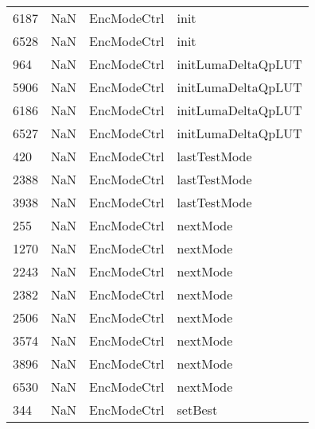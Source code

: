 \begin{tabular}{llll}
6187 &                   NaN &                EncModeCtrl &                                      init \\
6528 &                   NaN &                EncModeCtrl &                                      init \\
964  &                   NaN &                EncModeCtrl &                        initLumaDeltaQpLUT \\
5906 &                   NaN &                EncModeCtrl &                        initLumaDeltaQpLUT \\
6186 &                   NaN &                EncModeCtrl &                        initLumaDeltaQpLUT \\
6527 &                   NaN &                EncModeCtrl &                        initLumaDeltaQpLUT \\
420  &                   NaN &                EncModeCtrl &                              lastTestMode \\
2388 &                   NaN &                EncModeCtrl &                              lastTestMode \\
3938 &                   NaN &                EncModeCtrl &                              lastTestMode \\
255  &                   NaN &                EncModeCtrl &                                  nextMode \\
1270 &                   NaN &                EncModeCtrl &                                  nextMode \\
2243 &                   NaN &                EncModeCtrl &                                  nextMode \\
2382 &                   NaN &                EncModeCtrl &                                  nextMode \\
2506 &                   NaN &                EncModeCtrl &                                  nextMode \\
3574 &                   NaN &                EncModeCtrl &                                  nextMode \\
3896 &                   NaN &                EncModeCtrl &                                  nextMode \\
6530 &                   NaN &                EncModeCtrl &                                  nextMode \\
344  &                   NaN &                EncModeCtrl &                                   setBest \\

\end{tabular}
